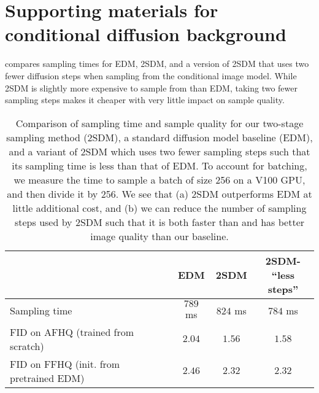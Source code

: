 \chapter{Supporting materials for conditional diffusion background} \label{supp:conditional-diffusion}

 compares sampling times for EDM, 2SDM, and a version of 2SDM that uses two fewer diffusion steps when sampling from the conditional image model. While 2SDM is slightly more expensive to sample from than EDM, taking two fewer sampling steps makes it cheaper with very little impact on sample quality.

\begin{table}[h]
    \centering
    \caption{Comparison of sampling time and sample quality for our two-stage sampling method (2SDM), a standard diffusion model baseline (EDM), and a variant of 2SDM which uses two fewer sampling steps such that its sampling time is less than that of EDM. To account for batching, we measure the time to sample a batch of size 256 on a V100 GPU, and then divide it by 256. We see that (a) 2SDM outperforms EDM at little additional cost, and (b) we can reduce the number of sampling steps used by 2SDM such that it is both faster than and has better image quality than our baseline.}
    \begin{tabular}{l|ccc}
                         & EDM & 2SDM & \shortstack{2SDM- \\ ``less steps''} \\
                         \hline
    Sampling time        & $789$ ms & $824$ ms  & $784$ ms         \\
    FID on AFHQ (trained from scratch)         & $2.04$   & $1.56$ & $1.58$                   \\
    FID on FFHQ (init. from pretrained EDM)         & $2.46$   & $2.32$ & $2.32$                   \\
    \end{tabular}
    \label{tab:fid-and-time}
\end{table}